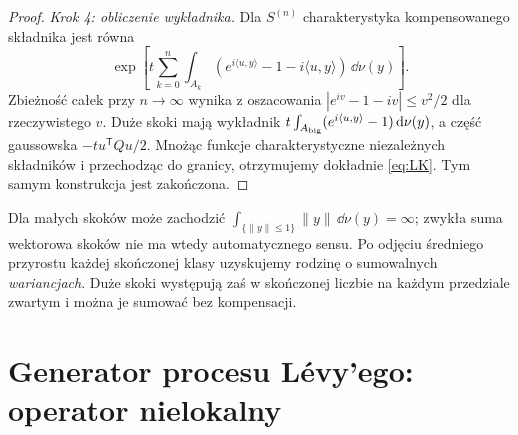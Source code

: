 \begin{proof}
\emph{Krok 4: obliczenie wykładnika.} Dla $S^{(n)}$
charakterystyka kompensowanego składnika jest równa
\[
\exp\left[t\sum_{k=0}^n\int_{A_k}
(e^{i\langle u,y\rangle}-1-i\langle u,y\rangle)
\,\dd\nu(y)\right].
\]
Zbieżność całek przy $n\to\infty$ wynika z oszacowania
$|e^{iv}-1-iv|\le v^2/2$ dla rzeczywistego $v$.
Duże skoki mają wykładnik
$t\int_{A_{\rm big}}(e^{i\langle u,y\rangle}-1)\,\mathrm{d}\nu(y)$,
a część gaussowska $-tu^{\mathsf T}Qu/2$.
Mnożąc funkcje charakterystyczne niezależnych składników
i przechodząc do granicy, otrzymujemy dokładnie
\eqref{eq:LK}. Tym samym konstrukcja jest zakończona.
\end{proof}

\begin{uwaga}
Dla małych skoków może zachodzić
$\int_{\{\|y\|\le1\}}\|y\|\,\dd\nu(y)=\infty$;
zwykła suma wektorowa skoków nie ma wtedy automatycznego
sensu. Po odjęciu średniego przyrostu każdej skończonej
klasy uzyskujemy rodzinę o sumowalnych \emph{wariancjach}.
Duże skoki występują zaś w skończonej liczbie na każdym
przedziale zwartym i można je sumować bez kompensacji.
\end{uwaga}

\section{Generator procesu Lévy'ego: operator nielokalny}

